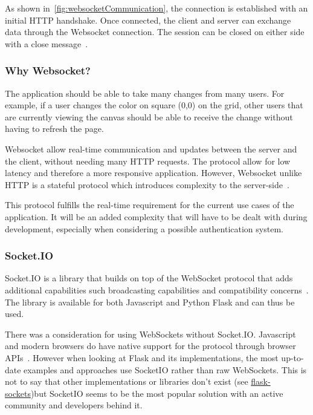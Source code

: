 As shown in~\ref{fig:websocketCommunication}, the connection is established with an initial HTTP handshake.
Once connected, the client and server can exchange data through the Websocket connection.
The session can be closed on either side with a close message~\cite{diaconu}.

\subsubsection{Why Websocket?}
The application should be able to take many changes from many users.
For example, if a user changes the color on square (0,0) on the grid, other users that are currently viewing the canvas should be able to receive the change without having to refresh the page.

Websocket allow real-time communication and updates between the server and the client, without needing many HTTP requests.
The protocol allow for low latency and therefore a more responsive application.
However, Websocket unlike HTTP is a stateful protocol which introduces complexity to the server-side~\cite{diaconu}.

This protocol fulfills the real-time requirement for the current use cases of the application.
It will be an added complexity that will have to be dealt with during development, especially when considering a possible authentication system.

\subsubsection{Socket.IO}

Socket.IO is a library that builds on top of the WebSocket protocol that adds additional capabilities such broadcasting capabilities and compatibility concerns~\cite{socketio}.
The library is available for both Javascript and Python Flask and can thus be used.

There was a consideration for using WebSockets without Socket.IO.
Javascript and modern browsers do have native support for the protocol through browser APIs~\cite{websocketMozilla}.
However when looking at Flask and its implementations, the most up-to-date examples and approaches use SocketIO rather than raw WebSockets.
This is not to say that other implementations or libraries don't exist (see \href{https://github.com/kennethreitz/flask-sockets}{flask-sockets})but SocketIO seems to be the most popular solution with an active community and developers behind it.
